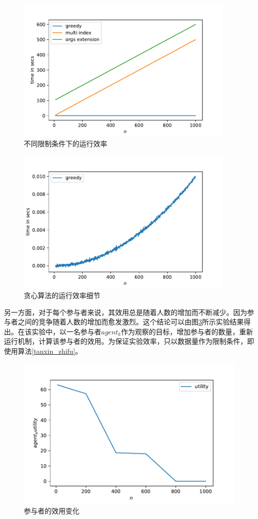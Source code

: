 \documentclass[promaster]{thesis-uestc}
\begin{document}
\begin{figure}[H]
    \includegraphics[width=300pt]{exp/threetimes.pdf}
    \caption{不同限制条件下的运行效率}
    \label{times}
\end{figure}

\begin{figure}[H]
    \includegraphics[width=300pt]{exp/greedytimes.pdf}
    \caption{贪心算法的运行效率细节}
    \label{greedytimes}
\end{figure}

另一方面，对于每个参与者来说，其效用总是随着人数的增加而不断减少。因为参与者之间的竞争随着人数的增加而愈发激烈。这个结论可以由图\ref{utility}所示实验结果得出。在该实验中，以一名参与者$agent_k$作为观察的目标，增加参与者的数量，重新运行机制，计算该参与者的效用。为保证实验效率，只以数据量作为限制条件，即使用算法\ref{tanxin_zhifu}。

\begin{figure}[H]
\includegraphics[width=350pt]{exp/utility.pdf}
\caption{参与者的效用变化}
\label{utility}
\end{figure}
\end{document}
